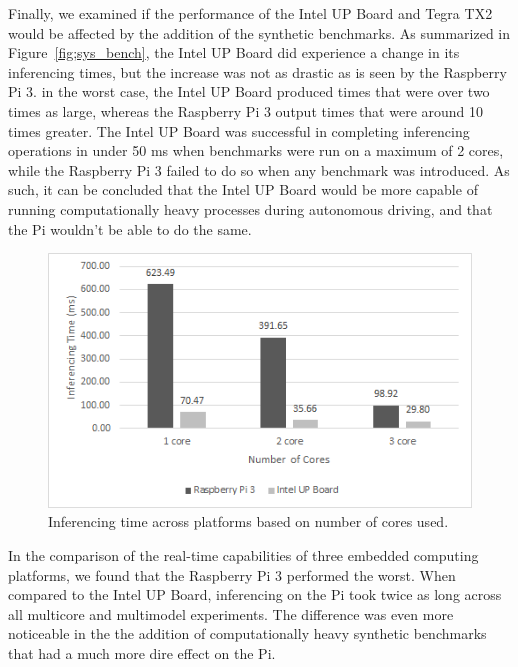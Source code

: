 Finally, we examined if the performance of the Intel UP Board and Tegra TX2 would be affected by the 
addition of the synthetic benchmarks. As summarized in Figure~\ref{fig;sys_bench}, the Intel UP Board 
did experience a change in its inferencing times, but the increase was not as drastic as is seen by 
the Raspberry Pi 3. in the worst case, the Intel UP Board produced times that were over two times as 
large, whereas the Raspberry Pi 3 output times that were around 10 times greater. The Intel UP Board 
was successful in completing inferencing operations in under 50 ms when benchmarks were run on a 
maximum of 2 cores, while the Raspberry Pi 3 failed to do so when any benchmark was introduced. As 
such, it can be concluded that the Intel UP Board would be more capable of running computationally 
heavy processes during autonomous driving, and that the Pi wouldn't be able to do the same.

\begin{figure}[h]
  \centering
  \includegraphics[width=.5\textwidth]{figs/system_benchmark}
  \caption{Inferencing time across platforms based on number of cores used.}
  \label{fig:sys_bench}
\end{figure} 

In the comparison of the real-time capabilities of three embedded computing platforms, we found that 
the Raspberry Pi 3 performed the worst. When compared to the Intel UP Board, inferencing on the Pi 
took twice as long across all multicore and multimodel experiments. The difference was even more 
noticeable in the the addition of computationally heavy synthetic benchmarks that had a much more 
dire effect on the Pi.





